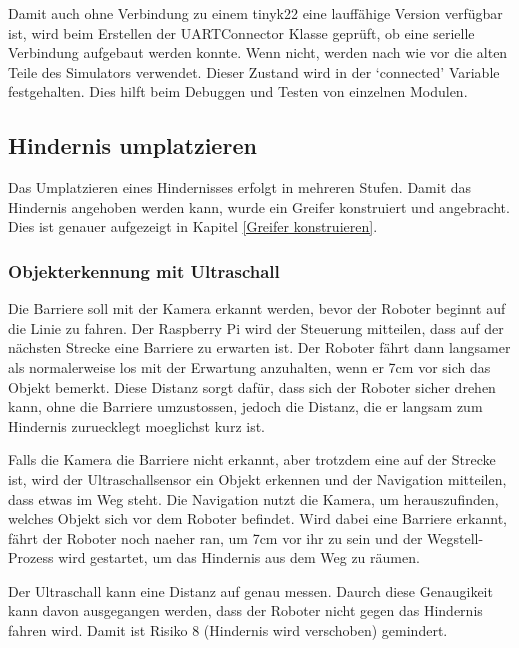 Damit auch ohne Verbindung zu einem \gls{tinyk22} eine lauffähige Version verfügbar ist, wird beim Erstellen der UARTConnector Klasse geprüft, ob eine serielle Verbindung aufgebaut werden konnte. Wenn nicht, werden nach wie vor die alten Teile des Simulators verwendet. Dieser Zustand wird in der `connected' Variable festgehalten. Dies hilft beim Debuggen und Testen von einzelnen Modulen.


\newpage
\subsection{Hindernis umplatzieren}

Das Umplatzieren eines Hindernisses erfolgt in mehreren Stufen. Damit das Hindernis angehoben werden kann, wurde ein Greifer konstruiert und angebracht. Dies ist genauer aufgezeigt in Kapitel \ref{Greifer konstruieren}.

\subsubsection{Objekterkennung mit Ultraschall}
\label{hindernis-um-ultraschall}

Die Barriere soll mit der Kamera erkannt werden, bevor der Roboter beginnt auf die Linie zu fahren. Der Raspberry Pi wird der Steuerung mitteilen, dass auf der nächsten Strecke eine Barriere zu erwarten ist. Der Roboter fährt dann langsamer als normalerweise los mit der Erwartung anzuhalten, wenn er 7cm vor sich das Objekt bemerkt. Diese Distanz sorgt dafür, dass sich der Roboter sicher drehen kann, ohne die Barriere umzustossen, jedoch die Distanz, die er langsam zum Hindernis zuruecklegt moeglichst kurz ist.

Falls die Kamera die Barriere nicht erkannt, aber trotzdem eine auf der Strecke ist, wird der Ultraschallsensor ein Objekt erkennen und der Navigation mitteilen, dass etwas im Weg steht. Die Navigation nutzt die Kamera, um herauszufinden, welches Objekt sich vor dem Roboter befindet. Wird dabei eine Barriere erkannt, fährt der Roboter noch naeher ran, um 7cm vor ihr zu sein und der Wegstell-Prozess wird gestartet, um das Hindernis aus dem Weg zu räumen. 

Der Ultraschall kann eine Distanz auf \pm 1cm genau messen. Daurch diese Genaugikeit kann davon ausgegangen werden, dass der Roboter nicht gegen das Hindernis fahren wird. Damit ist Risiko 8 (Hindernis wird verschoben) gemindert.

